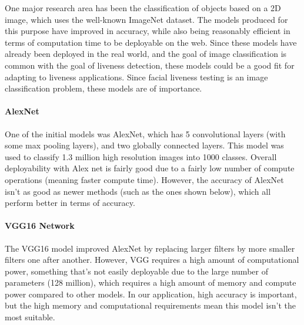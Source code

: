 \documentclass[10pt,a4paper]{article}
\begin{document}
        One major research area has been the classification of objects based on a 2D image, which uses the well-known ImageNet dataset. The models produced for this purpose have improved in accuracy,
        while also being reasonably efficient in terms of computation time to be deployable on the web. Since these models have already been deployed in the real world, and the goal of image classification
        is common with the goal of liveness detection, these models could be a good fit for adapting to liveness applications. Since facial liveness testing is
        an image classification problem, these models are of importance.
            
            \paragraph{AlexNet} 
            One of the initial models was AlexNet, which has 5 convolutional layers (with some max pooling layers), and two globally connected layers.
            This model was used to classify 1.3 million high resolution images into 1000 classes. \cite{AlexNet} Overall deployability
            with Alex net is fairly good due to a fairly low number of compute operations (meaning faster compute time). \cite{DeepNeuralNetworkDeployability} However, the accuracy of AlexNet isn't
            as good as newer methods (such as the ones shown below), which all perform better in terms of accuracy. 
            
            \paragraph{VGG16 Network}
            The VGG16 model improved AlexNet by replacing larger filters by more smaller filters one after another.
            However, VGG requires a high amount of computational power, something that's not easily deployable due to
            the large number of parameters (128 million), which requires a high amount of memory and compute power compared
            to other models. \cite{DeepNeuralNetworkDeployability} In our application, high accuracy is important, but the high
            memory and computational requirements mean this model isn't the most suitable.
\end{document}
